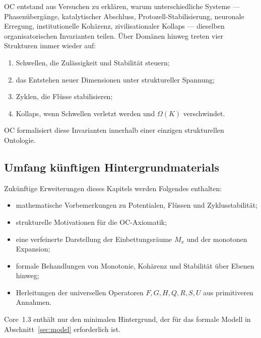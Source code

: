 OC entstand aus Versuchen zu erklären, warum unterschiedliche Systeme --- Phasenübergänge, katalytischer Abschluss, Protozell-Stabilisierung, neuronale Erregung, institutionelle Kohärenz, zivilisationaler Kollaps --- dieselben organisatorischen Invarianten teilen.  
Über Domänen hinweg treten vier Strukturen immer wieder auf:

\begin{enumerate}
    \item Schwellen, die Zulässigkeit und Stabilität steuern;
    \item das Entstehen neuer Dimensionen unter struktureller Spannung;
    \item Zyklen, die Flüsse stabilisieren;
    \item Kollaps, wenn Schwellen verletzt werden und \(\Omega(K)\) verschwindet.
\end{enumerate}

OC formalisiert diese Invarianten innerhalb einer einzigen strukturellen Ontologie.

\subsection{Umfang künftigen Hintergrundmaterials}

Zukünftige Erweiterungen dieses Kapitels werden Folgendes enthalten:

\begin{itemize}
    \item mathematische Vorbemerkungen zu Potentialen, Flüssen und Zyklusstabilität;
    \item strukturelle Motivationen für die OC-Axiomatik;
    \item eine verfeinerte Darstellung der Einbettungsräume \(M_x\) und der monotonen Expansion;
    \item formale Behandlungen von Monotonie, Kohärenz und Stabilität über Ebenen hinweg;
    \item Herleitungen der universellen Operatoren \(F,G,H,Q,R,S,U\) aus primitiveren Annahmen.
\end{itemize}

Core~1.3 enthält nur den minimalen Hintergrund, der für das formale Modell in Abschnitt~\ref{sec:model} erforderlich ist.
